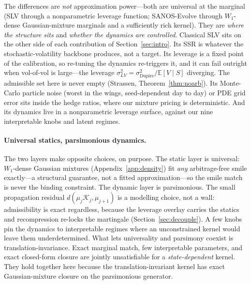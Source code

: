 \documentclass[11pt]{article}
\newcommand{\E}{\mathbb{E}}
\newcommand{\cK}{\mathcal{K}}
\begin{document}
The differences are \emph{not} approximation power---both are universal at the marginal (SLV
through a nonparametric leverage function; SANOS-Evolve through $W_1$-dense Gaussian-mixture
marginals and a sufficiently rich kernel). They are \emph{where the structure sits} and
\emph{whether the dynamics are controlled}. Classical SLV sits on the other side of each
contribution of Section~\ref{sec:intro}. Its SSR is whatever the stochastic-volatility backbone
produces, not a target. Its leverage is a fixed point of the calibration, so re-tuning the dynamics re-triggers it,
and it can fail outright when vol-of-vol is large---the leverage
$\sigma_{LV}^2=\sigma_{\mathrm{Dupire}}^2/\E[V\mid S]$ diverging. The admissible set here is never
empty (Strassen, Theorem~\ref{thm:noarb}). Its Monte-Carlo particle noise (worst in the
wings, seed-dependent day to day) or PDE grid error sits inside the hedge ratios, where our
mixture pricing is deterministic. And its dynamics live in a nonparametric leverage surface,
against our nine interpretable knobs and latent regimes.

\paragraph{Universal statics, parsimonious dynamics.}
The two layers make opposite choices, on purpose. The static layer is universal: $W_1$-dense
Gaussian mixtures (Appendix~\ref{app:density}) fit \emph{any} arbitrage-free smile exactly---a
structural guarantee, not a fitted approximation---so the smile match is never the binding
constraint. The dynamic layer is parsimonious. The small propagation residual
$d(\mu_j\cK_j,\mu_{j+1})$ is a modelling choice, not a wall: admissibility is exact regardless, because
the leverage overlay carries the statics and recompression re-locks the martingale
(Section~\ref{sec:decouple}). A few knobs pin the dynamics to interpretable regimes where an
unconstrained kernel would leave them underdetermined. What lets universality and parsimony coexist is translation-invariance. Exact marginal match,
few interpretable parameters, and exact closed-form closure are jointly unsatisfiable for a
\emph{state-dependent} kernel. They hold together here because the translation-invariant kernel has
exact Gaussian-mixture closure on the parsimonious generator.
\end{document}
